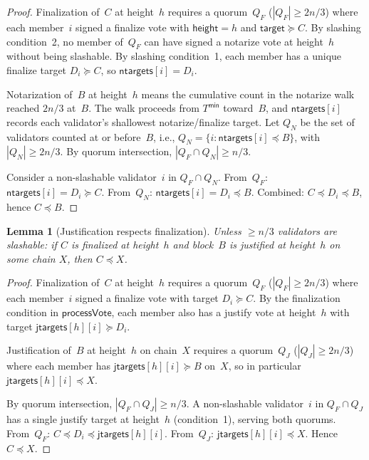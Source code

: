 \ifx\litemode\undefined\documentclass{article}\fi
\newcommand{\target}{\mathsf{target}}
\newcommand{\jtargets}{\mathsf{jtargets}}
\newcommand{\ntargets}{\mathsf{ntargets}}
\newcommand{\height}{\mathsf{height}}
\theoremstyle{plain}
\newtheorem{lemma}{Lemma}
\theoremstyle{definition}
\theoremstyle{remark}
\begin{document}
\begin{proof}
Finalization of~$C$ at height~$h$ requires a quorum~$Q_F$ ($|Q_F| \geq 2n/3$) where each member~$i$ signed a finalize vote with $\height = h$ and $\target \succeq C$.
By slashing condition~2, no member of~$Q_F$ can have signed a notarize vote at height~$h$ without being slashable.
By slashing condition~1, each member has a unique finalize target $D_i \succeq C$, so $\ntargets[i] = D_i$.

Notarization of~$B$ at height~$h$ means the cumulative count in the notarize walk reached $2n/3$ at~$B$.
The walk proceeds from $T^\mathsf{min}$ toward~$B$, and $\ntargets[i]$ records each validator's shallowest notarize/finalize target.
Let $Q_N$ be the set of validators counted at or before~$B$, i.e., $Q_N = \{i : \ntargets[i] \preceq B\}$, with $|Q_N| \geq 2n/3$.
By quorum intersection, $|Q_F \cap Q_N| \geq n/3$.

Consider a non-slashable validator~$i$ in $Q_F \cap Q_N$.
From~$Q_F$: $\ntargets[i] = D_i \succeq C$.
From~$Q_N$: $\ntargets[i] = D_i \preceq B$.
Combined: $C \preceq D_i \preceq B$, hence $C \preceq B$.
\end{proof}


\begin{lemma}[Justification respects finalization]\label{lem:tbd}
Unless $\geq n/3$ validators are slashable: if $C$ is finalized at height~$h$ and block~$B$ is justified at height~$h$ on some chain $X$, then $C \preceq X$.
\end{lemma}

\begin{proof}
Finalization of~$C$ at height~$h$ requires a quorum~$Q_F$ ($|Q_F| \geq 2n/3$) where each member~$i$ signed a finalize vote with target $D_i \succeq C$.
By the finalization condition in $\textsf{processVote}$, each member also has a justify vote at height~$h$ with target $\jtargets[h][i] \succeq D_i$.

Justification of~$B$ at height~$h$ on chain~$X$ requires a quorum~$Q_J$ ($|Q_J| \geq 2n/3$) where each member has $\jtargets[h][i] \succeq B$ on~$X$, so in particular $\jtargets[h][i] \preceq X$.

By quorum intersection, $|Q_F \cap Q_J| \geq n/3$.
A non-slashable validator~$i$ in $Q_F \cap Q_J$ has a single justify target at height~$h$ (condition~1), serving both quorums.
From~$Q_F$: $C \preceq D_i \preceq \jtargets[h][i]$.
From~$Q_J$: $\jtargets[h][i] \preceq X$.
Hence $C \preceq X$.
\end{proof}
\end{document}
